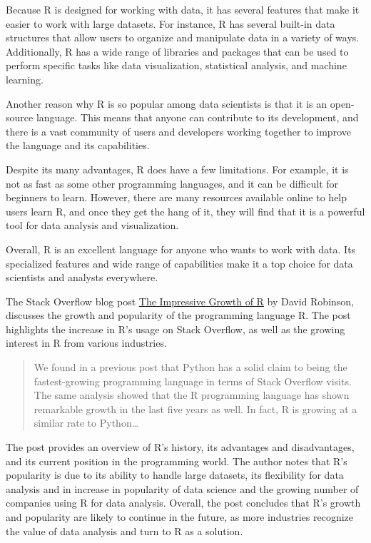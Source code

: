 \documentclass[
]{book}
\begin{document}
Because R is designed for working with data, it has several features that make it easier to work with large datasets. For instance, R has several built-in data structures that allow users to organize and manipulate data in a variety of ways. Additionally, R has a wide range of libraries and packages that can be used to perform specific tasks like data visualization, statistical analysis, and machine learning.

Another reason why R is so popular among data scientists is that it is an open-source language. This means that anyone can contribute to its development, and there is a vast community of users and developers working together to improve the language and its capabilities.

Despite its many advantages, R does have a few limitations. For example, it is not as fast as some other programming languages, and it can be difficult for beginners to learn. However, there are many resources available online to help users learn R, and once they get the hang of it, they will find that it is a powerful tool for data analysis and visualization.

Overall, R is an excellent language for anyone who wants to work with data. Its specialized features and wide range of capabilities make it a top choice for data scientists and analysts everywhere.

The Stack Overflow blog post \href{https://stackoverflow.blog/2017/10/10/impressive-growth-r/}{The Impressive Growth of R} by David Robinson, discusses the growth and popularity of the programming language R. The post highlights the increase in R's usage on Stack Overflow, as well as the growing interest in R from various industries.

\begin{quote}
We found in a previous post that Python has a solid claim to being the fastest-growing programming language in terms of Stack Overflow visits. The same analysis showed that the R programming language has shown remarkable growth in the last five years as well. In fact, R is growing at a similar rate to Python\ldots{}
\end{quote}

The post provides an overview of R's history, its advantages and disadvantages, and its current position in the programming world. The author notes that R's popularity is due to its ability to handle large datasets, its flexibility for data analysis and in increase in popularity of data science and the growing number of companies using R for data analysis. Overall, the post concludes that R's growth and popularity are likely to continue in the future, as more industries recognize the value of data analysis and turn to R as a solution.
\end{document}

